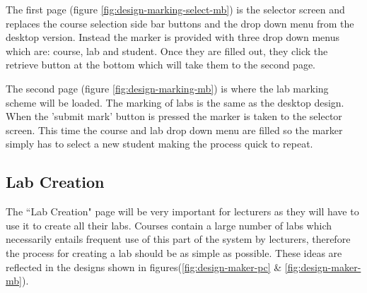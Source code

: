 \documentclass[11pt]{report}
\begin{document}
The first page (figure \ref{fig:design-marking-select-mb}) is the selector screen and replaces the course selection side bar buttons and the drop down menu from the desktop version. Instead the marker is provided with three drop down menus which are: course, lab and student. Once they are filled out, they click the retrieve button at the bottom which will take them to the second page.

The second page (figure \ref{fig:design-marking-mb}) is where the lab marking scheme will be loaded. The marking of labs is the same as the desktop design. When the 'submit mark' button is pressed the marker is taken to the selector screen. This time the course and lab drop down menu are filled so the marker simply has to select a new student making the process quick to repeat. 




\subsection{Lab Creation}
The ``Lab Creation" page will be very important for lecturers as they will have to use it to create all their labs. Courses contain a large number of labs which necessarily entails frequent use of this part of the system by lecturers, therefore the process for creating a lab should be as simple as possible. These ideas are reflected in the designs shown in figures(\ref{fig:design-maker-pc} \& \ref{fig:design-maker-mb}).
\end{document}
